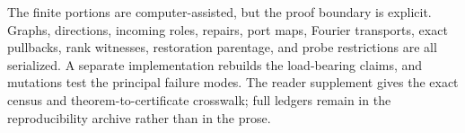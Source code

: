 The finite portions are computer-assisted, but the proof boundary is
explicit.  Graphs, directions, incoming roles, repairs, port maps, Fourier
transports, exact pullbacks, rank witnesses, restoration parentage, and probe
restrictions are all serialized.  A separate implementation rebuilds the
load-bearing claims, and mutations test the principal failure modes.  The
reader supplement gives the exact census and theorem-to-certificate
crosswalk; full ledgers remain in the reproducibility archive rather than in
the prose.
